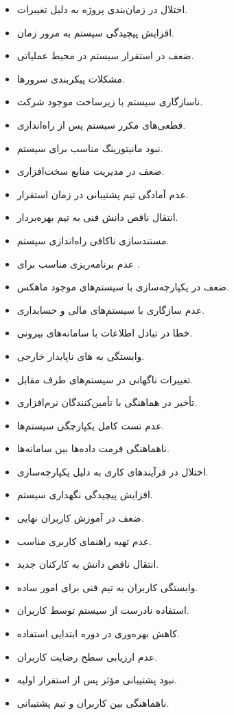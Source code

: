 \documentclass[12pt,a4paper]{report}
\begin{document}
\begin{itemize}
\item 
اختلال در زمان‌بندی پروژه به دلیل تغییرات.
\item 
افزایش پیچیدگی سیستم به مرور زمان.
\item 
ضعف در استقرار سیستم در محیط عملیاتی.
\item 
مشکلات پیکربندی سرورها.
\item 
ناسازگاری سیستم با زیرساخت موجود شرکت.
\item 
قطعی‌های مکرر سیستم پس از راه‌اندازی.
\item 
نبود مانیتورینگ مناسب برای سیستم.
\item 
ضعف در مدیریت منابع سخت‌افزاری.
\item 
عدم آمادگی تیم پشتیبانی در زمان استقرار.
\item 
انتقال ناقص دانش فنی به تیم بهره‌بردار.
\item 
مستندسازی ناکافی راه‌اندازی سیستم.
\item 
عدم برنامه‌ریزی مناسب برای .
\item 
ضعف در یکپارچه‌سازی با سیستم‌های موجود ماهکس.
\item 
عدم سازگاری با سیستم‌های مالی و حسابداری.
\item 
خطا در تبادل اطلاعات با سامانه‌های بیرونی.
\item 
وابستگی به های ناپایدار خارجی.
\item 
تغییرات ناگهانی در سیستم‌های طرف مقابل.
\item 
تأخیر در هماهنگی با تأمین‌کنندگان نرم‌افزاری.
\item 
عدم تست کامل یکپارچگی سیستم‌ها.
\item 
ناهماهنگی فرمت داده‌ها بین سامانه‌ها.
\item 
اختلال در فرآیندهای کاری به دلیل یکپارچه‌سازی.
\item 
افزایش پیچیدگی نگهداری سیستم.
\item 
ضعف در آموزش کاربران نهایی.
\item 
عدم تهیه راهنمای کاربری مناسب.
\item 
انتقال ناقص دانش به کارکنان جدید.
\item 
وابستگی کاربران به تیم فنی برای امور ساده.
\item 
استفاده نادرست از سیستم توسط کاربران.
\item 
کاهش بهره‌وری در دوره ابتدایی استفاده.
\item 
عدم ارزیابی سطح رضایت کاربران.
\item 
نبود پشتیبانی مؤثر پس از استقرار اولیه.
\item 
ناهماهنگی بین کاربران و تیم پشتیبانی.

\end{itemize}
\end{document}
